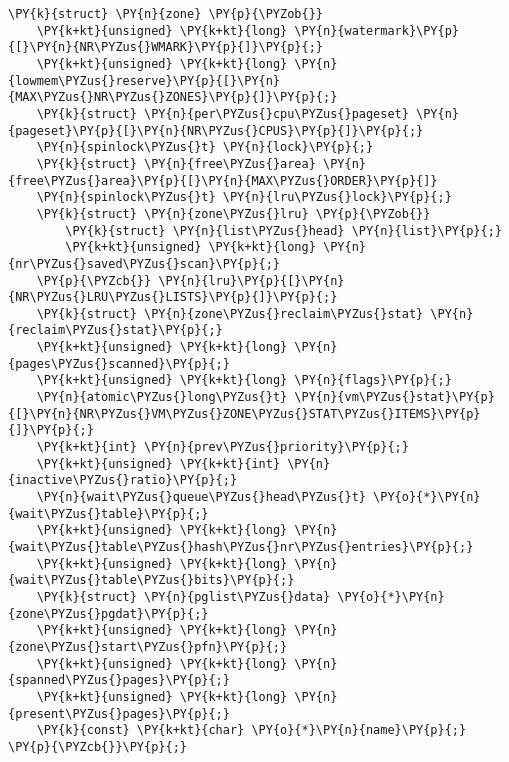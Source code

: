 \begin{Verbatim}[commandchars=\\\{\}]
\PY{k}{struct} \PY{n}{zone} \PY{p}{\PYZob{}}
	\PY{k+kt}{unsigned} \PY{k+kt}{long} \PY{n}{watermark}\PY{p}{[}\PY{n}{NR\PYZus{}WMARK}\PY{p}{]}\PY{p}{;}
	\PY{k+kt}{unsigned} \PY{k+kt}{long} \PY{n}{lowmem\PYZus{}reserve}\PY{p}{[}\PY{n}{MAX\PYZus{}NR\PYZus{}ZONES}\PY{p}{]}\PY{p}{;}
	\PY{k}{struct} \PY{n}{per\PYZus{}cpu\PYZus{}pageset} \PY{n}{pageset}\PY{p}{[}\PY{n}{NR\PYZus{}CPUS}\PY{p}{]}\PY{p}{;}
	\PY{n}{spinlock\PYZus{}t} \PY{n}{lock}\PY{p}{;}
   	\PY{k}{struct} \PY{n}{free\PYZus{}area} \PY{n}{free\PYZus{}area}\PY{p}{[}\PY{n}{MAX\PYZus{}ORDER}\PY{p}{]}
  	\PY{n}{spinlock\PYZus{}t} \PY{n}{lru\PYZus{}lock}\PY{p}{;}
   	\PY{k}{struct} \PY{n}{zone\PYZus{}lru} \PY{p}{\PYZob{}}
   		\PY{k}{struct} \PY{n}{list\PYZus{}head} \PY{n}{list}\PY{p}{;}
   		\PY{k+kt}{unsigned} \PY{k+kt}{long} \PY{n}{nr\PYZus{}saved\PYZus{}scan}\PY{p}{;}
   	\PY{p}{\PYZcb{}} \PY{n}{lru}\PY{p}{[}\PY{n}{NR\PYZus{}LRU\PYZus{}LISTS}\PY{p}{]}\PY{p}{;}
   	\PY{k}{struct} \PY{n}{zone\PYZus{}reclaim\PYZus{}stat} \PY{n}{reclaim\PYZus{}stat}\PY{p}{;}
	\PY{k+kt}{unsigned} \PY{k+kt}{long} \PY{n}{pages\PYZus{}scanned}\PY{p}{;}
	\PY{k+kt}{unsigned} \PY{k+kt}{long} \PY{n}{flags}\PY{p}{;}
   	\PY{n}{atomic\PYZus{}long\PYZus{}t} \PY{n}{vm\PYZus{}stat}\PY{p}{[}\PY{n}{NR\PYZus{}VM\PYZus{}ZONE\PYZus{}STAT\PYZus{}ITEMS}\PY{p}{]}\PY{p}{;}
   	\PY{k+kt}{int} \PY{n}{prev\PYZus{}priority}\PY{p}{;}
   	\PY{k+kt}{unsigned} \PY{k+kt}{int} \PY{n}{inactive\PYZus{}ratio}\PY{p}{;}
   	\PY{n}{wait\PYZus{}queue\PYZus{}head\PYZus{}t} \PY{o}{*}\PY{n}{wait\PYZus{}table}\PY{p}{;}
   	\PY{k+kt}{unsigned} \PY{k+kt}{long} \PY{n}{wait\PYZus{}table\PYZus{}hash\PYZus{}nr\PYZus{}entries}\PY{p}{;}
   	\PY{k+kt}{unsigned} \PY{k+kt}{long} \PY{n}{wait\PYZus{}table\PYZus{}bits}\PY{p}{;}
   	\PY{k}{struct} \PY{n}{pglist\PYZus{}data} \PY{o}{*}\PY{n}{zone\PYZus{}pgdat}\PY{p}{;}
   	\PY{k+kt}{unsigned} \PY{k+kt}{long} \PY{n}{zone\PYZus{}start\PYZus{}pfn}\PY{p}{;}
   	\PY{k+kt}{unsigned} \PY{k+kt}{long} \PY{n}{spanned\PYZus{}pages}\PY{p}{;}
   	\PY{k+kt}{unsigned} \PY{k+kt}{long} \PY{n}{present\PYZus{}pages}\PY{p}{;}
   	\PY{k}{const} \PY{k+kt}{char} \PY{o}{*}\PY{n}{name}\PY{p}{;}
\PY{p}{\PYZcb{}}\PY{p}{;}
\end{Verbatim}
